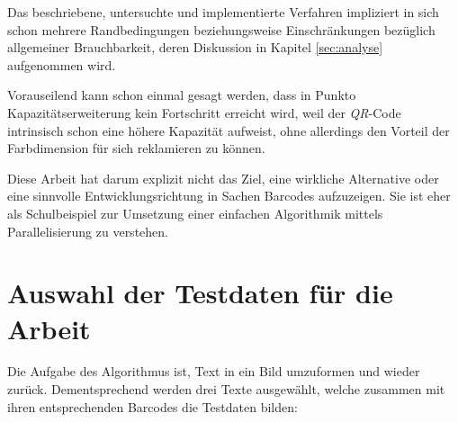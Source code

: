 \documentclass[11pt]{scrreprt} %
\theoremstyle{definition}
\begin{document}
Das beschriebene, untersuchte und implementierte Verfahren \cite{paper} impliziert in sich schon mehrere Randbedingungen beziehungsweise Einschränkungen bezüglich allgemeiner Brauchbarkeit, deren Diskussion in Kapitel \ref{sec:analyse} aufgenommen wird.

Vorauseilend kann schon einmal gesagt werden, dass in Punkto Kapazitätserweiterung kein Fortschritt erreicht wird, weil der {\it QR}-Code intrinsisch schon eine höhere Kapazität aufweist, ohne allerdings den Vorteil der Farbdimension für sich reklamieren zu können.

Diese Arbeit hat darum explizit nicht das Ziel, eine wirkliche Alternative oder eine sinnvolle Entwicklungsrichtung in Sachen Barcodes aufzuzeigen. Sie ist eher als Schulbeispiel zur Umsetzung einer einfachen Algorithmik mittels Parallelisierung zu verstehen.

\chapter{Auswahl der Testdaten für die Arbeit}

Die Aufgabe des Algorithmus ist, Text in ein Bild umzuformen und wieder zurück. Dementsprechend werden drei Texte ausgewählt, welche zusammen mit ihren entsprechenden Barcodes die Testdaten bilden:
\end{document}
